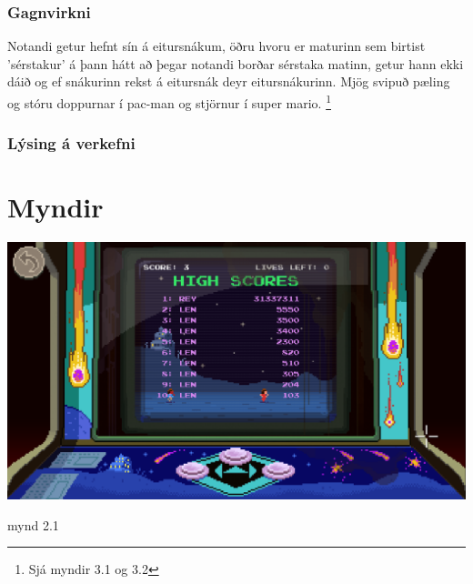 \documentclass{article}
\begin{document}
\subsubsection*{Gagnvirkni}
Notandi getur hefnt sín á eitursnákum, öðru hvoru er maturinn sem birtist 'sérstakur'
á þann hátt að þegar notandi borðar sérstaka matinn, 
getur hann ekki dáið og ef snákurinn rekst á eitursnák deyr eitursnákurinn.
Mjög svipuð pæling og stóru doppurnar í pac-man og stjörnur í super mario.
\footnote{Sjá myndir 3.1 og 3.2}

\subsubsection*{Lýsing á verkefni}

\section*{Myndir}
\begin{center}
    \includegraphics[scale=0.25]{imgs/highscore.png}
\end{center}
mynd 2.1
\end{document}
